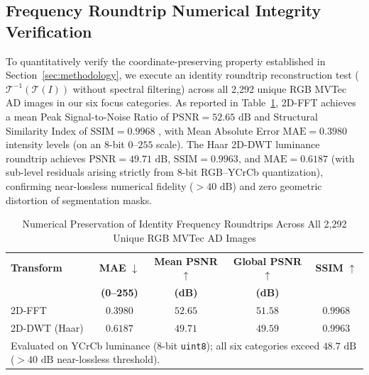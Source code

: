 \subsection{Frequency Roundtrip Numerical Integrity Verification}
To quantitatively verify the coordinate-preserving property established in Section~\ref{sec:methodology}, we execute an identity roundtrip reconstruction test ($\mathcal{T}^{-1}(\mathcal{T}(I))$ without spectral filtering) across all 2,292 unique RGB MVTec AD images in our six focus categories. As reported in Table~\ref{tab:reconstruction_metrics}, 2D-FFT achieves a mean Peak Signal-to-Noise Ratio of $\text{PSNR} = 52.65\text{ dB}$ and Structural Similarity Index of $\text{SSIM} = 0.9968$ \cite{wang2004image}, with Mean Absolute Error $\text{MAE} = 0.3980$ intensity levels (on an 8-bit $0$--$255$ scale). The Haar 2D-DWT luminance roundtrip achieves $\text{PSNR} = 49.71\text{ dB}$, $\text{SSIM} = 0.9963$, and $\text{MAE} = 0.6187$ (with sub-level residuals arising strictly from 8-bit RGB--YCrCb quantization), confirming near-lossless numerical fidelity ($>40\text{ dB}$) and zero geometric distortion of segmentation masks.

\begin{table}[t]
\centering
\caption{Numerical Preservation of Identity Frequency Roundtrips Across All 2,292 Unique RGB MVTec AD Images}
\label{tab:reconstruction_metrics}
\setlength{\tabcolsep}{4pt}
\begin{tabular}{l c c c c}
\toprule
\textbf{Transform} & \textbf{MAE} $\downarrow$ & \textbf{Mean PSNR} $\uparrow$ & \textbf{Global PSNR} $\uparrow$ & \textbf{SSIM} $\uparrow$ \\
 & \textbf{(0--255)} & \textbf{(dB)} & \textbf{(dB)} & \\
\midrule
2D-FFT & $0.3980$ & $52.65$ & $51.58$ & $0.9968$ \\
2D-DWT (Haar) & $0.6187$ & $49.71$ & $49.59$ & $0.9963$ \\
\bottomrule
\multicolumn{5}{p{0.94\columnwidth}}{\footnotesize Evaluated on YCrCb luminance ($8$-bit \texttt{uint8}); all six categories exceed $48.7\text{ dB}$ ($>40\text{ dB}$ near-lossless threshold).}
\end{tabular}
\end{table}

